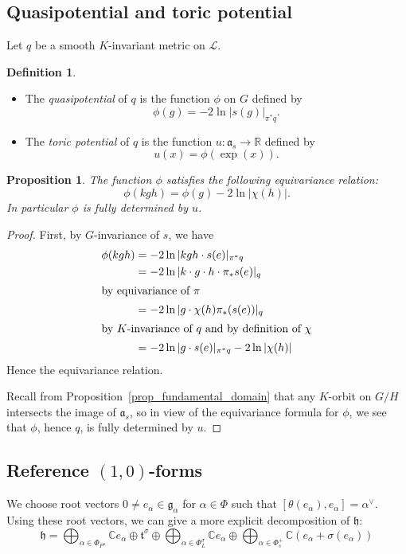 \documentclass{amsart}
\newtheorem{prop}[thm]{Proposition}
\theoremstyle{definition}
\newtheorem{defn}[thm]{Definition}
\begin{document}
\subsection{Quasipotential and toric potential}
Let $q$ be a smooth $K$-invariant metric on $\mathcal{L}$. 

\begin{defn} \mbox{}
\begin{itemize}
\item The \emph{quasipotential} of $q$ is the function $\phi$ on $G$ defined by 
\[
\phi(g)=-2\ln|s(g)|_{\pi^*q}.
\]
\item The \emph{toric potential} of $q$ is the function 
$u: \mathfrak{a}_s \rightarrow  \mathbb{R}$ defined by 
\[
u(x)=\phi(\exp(x)).
\]
\end{itemize}
\end{defn}

\begin{prop}
\label{prop_equivariance_quasipotential}
The function $\phi$ satisfies the following equivariance relation:
\[
\phi(kgh)=\phi(g) - 2\ln|\chi(h)|.
\]
In particular $\phi$ is fully determined by $u$. 
\end{prop}

\begin{proof}
First, by $G$-invariance of $s$, we have 
\begin{align*}
\phi(kgh)& =-2\ln|kgh\cdot s(e)|_{\pi^*q} \\
& = -2\ln|k\cdot g\cdot h\cdot \pi_*s(e)|_q \\
\intertext{by equivariance of $\pi$}
& = -2\ln|g\cdot \chi(h) \pi_*(s(e))|_q \\
\intertext{by $K$-invariance of $q$ and by definition of $\chi$}
& = -2\ln|g\cdot s(e)|_{\pi^*q}- 2\ln|\chi(h)|
\end{align*}
Hence the equivariance relation.

Recall from Proposition~\ref{prop_fundamental_domain} that any $K$-orbit 
on $G/H$ intersects the image of $\mathfrak{a}_s$, 
so in view of the equivariance formula for $\phi$, we see that 
$\phi$, hence $q$, is fully determined by $u$.
\end{proof}


\subsection{Reference $(1,0)$-forms}

We choose root vectors $0\neq e_{\alpha} \in \mathfrak{g}_{\alpha}$ 
for $\alpha\in \Phi$ such that $[\theta(e_{\alpha}),e_{\alpha}]=\alpha^{\vee}$.
Using these root vectors, we can give a more explicit decomposition of $\mathfrak{h}$: 
\[
\mathfrak{h} = \bigoplus_{\alpha\in \Phi_{P^u}} \mathbb{C}e_{\alpha} \oplus \mathfrak{t}^{\sigma} 
\oplus \bigoplus_{\alpha\in \Phi_L^{\sigma}} \mathbb{C}e_{\alpha} \oplus 
\bigoplus_{\alpha\in \Phi_s^+} \mathbb{C}(e_{\alpha}+\sigma(e_{\alpha}))
\]
\end{document}
